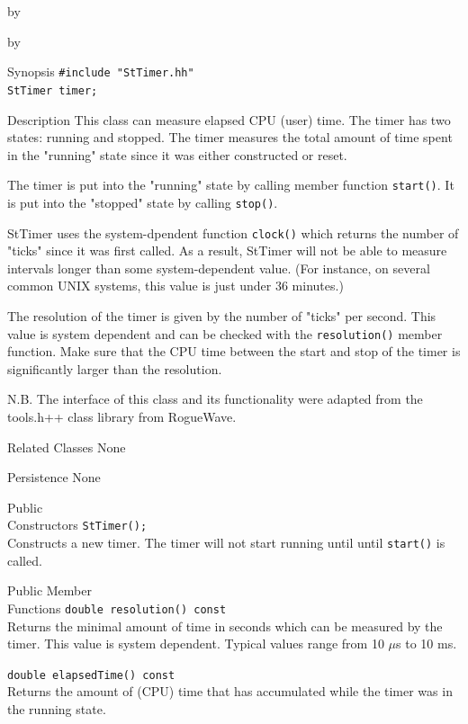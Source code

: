 \documentclass[twoside]{article}
\newcommand{\comp}[1]{\texttt{#1}}%
\newcommand{\entrylabel}[1]{\mbox{\textbf{{#1}}}\hfil}%
\newenvironment{entry}
{\begin{list}{}%
    {\renewcommand{\makelabel}{\entrylabel}%
     \setlength{\labelwidth}{90pt}%
     \setlength{\leftmargin}{\labelwidth}
     \advance\leftmargin by \labelsep%
      }%
    }%
  {\end{list}}
\newcommand{\Entrylabel}[1]%
{\raisebox{0pt}[1ex][0pt]{\makebox[\labelwidth][l]%
    {\parbox[t]{\labelwidth}{\hspace{0pt}\textbf{{#1}}}}}}
\newenvironment{Entry}%
{\renewcommand{\entrylabel}{\Entrylabel}\begin{entry}}%
  {\end{entry}}
\begin{document}
\begin{description}
\begin{Entry}
\begin{Entry}
\item[Synopsis]
    \verb+#include "StTimer.hh"+ \\
    \verb+StTimer timer;+
    
\item[Description]    
    This class can measure elapsed CPU (user) time. The timer has two
    states: running and stopped. The timer measures the total amount
    of time spent in the "running" state since it was either
    constructed or reset.
    
    The timer is put into the "running" state by calling member
    function \comp{start()}. It is put into the "stopped" state by
    calling \comp{stop()}.
    
    StTimer uses the system-dpendent function \comp{clock()} which
    returns the number of "ticks" since it was first called. As a
    result, StTimer will not be able to measure intervals longer than
    some system-dependent value. (For instance, on several common UNIX
    systems, this value is just under 36 minutes.)
    
    The resolution of the timer is given by the number of "ticks" per
    second.  This value is system dependent and can be checked with
    the \comp{resolution()} member function. Make sure that the CPU time
    between the start and stop of the timer is significantly larger
    than the resolution.

    N.B. The interface of this class and its functionality were adapted
    from the tools.h++ class library from RogueWave.
    
\item[Related Classes]
    None
    
\item[Persistence]
    None
    
\item[Public\\ Constructors]
    \verb+StTimer();+ \\
    Constructs a new timer. The timer will not start
    running until until \comp{start()} is called.

\item[Public Member\\ Functions]
    \verb+double resolution() const+\\
    Returns the minimal amount of time in seconds which can be
    measured by the timer. This value is system dependent.
    Typical values range from 10 $\mu$s to 10 ms.
    
    \verb+double elapsedTime() const+\\
    Returns the amount of (CPU) time that has accumulated while
    the timer was in the running state.
 

\end{Entry}
\end{Entry}
\end{description}
\end{document}
